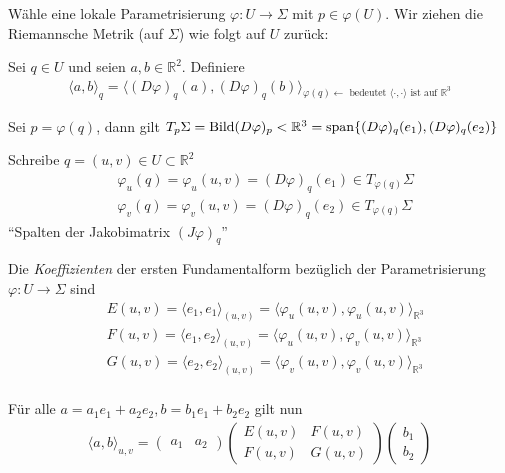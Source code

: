 \documentclass[../main.tex]{subfiles}
\begin{document}
Wähle eine lokale Parametrisierung $\varphi : U \to \Sigma$ mit $p \in \varphi (U)$.
Wir ziehen die Riemannsche Metrik (auf $\Sigma$) wie folgt auf $U$ zurück:

Sei $q \in U$ und seien $a,b \in \mathbb{R}^2$.
Definiere
\begin{align*}
    \langle a,b \rangle _q = \langle (D\varphi)_q(a), (D\varphi)_q(b)\rangle{_{\varphi(q) \leftarrow { \text{ bedeutet }\langle \cdot, \cdot \rangle \text{ ist auf } \mathbb{R}^3}}}
\end{align*}

Sei $p=\varphi (q)$, dann gilt $T_p\Sigma = \operatorname{Bild} (D\varphi)_p < \mathbb{R}^3 = \operatorname{span} \{ (D\varphi)_q(e_1),(D\varphi)_q(e_2)\}$

\begin{notation}
    Schreibe $q= (u,v) \in U \subset \mathbb{R}^2$
    \begin{align*}
        &\varphi_u (q)= \varphi_u(u,v) = (D\varphi)_q(e_1)\in T_{\varphi(q)}\Sigma \\
        &\varphi_v (q)= \varphi_v(u,v) = (D\varphi)_q(e_2)\in T_{\varphi(q)}\Sigma
    \end{align*}``Spalten der Jakobimatrix $(J\varphi)_q$''
\end{notation}

Die \emph{Koeffizienten} der ersten Fundamentalform bezüglich der Parametrisierung $\varphi: U \to \Sigma$ sind
\begin{align*}
    &E(u,v) = \langle e_1, e_1\rangle_{(u,v)} = \langle \varphi_u(u,v),\varphi_u(u,v)\rangle _{\mathbb{R}^3} \\
    &F(u,v) = \langle e_1, e_2\rangle_{(u,v)} = \langle \varphi_u(u,v),\varphi_v(u,v)\rangle _{\mathbb{R}^3} \\
    &G(u,v) = \langle e_2, e_2\rangle_{(u,v)} = \langle \varphi_v(u,v),\varphi_v(u,v)\rangle _{\mathbb{R}^3} \\
\end{align*}

Für alle $a=a_1e_1+a_2e_2, b=b_1e_1+b_2e_2$ gilt nun
\begin{align*}
    \langle a,b \rangle_{u,v} = \begin{pmatrix}
        a_1 & a_2
    \end{pmatrix}\begin{pmatrix}
        E(u,v) & F(u,v) \\
        F(u,v) & G(u,v)
    \end{pmatrix}\begin{pmatrix}
        b_1 \\ b_2
    \end{pmatrix}
\end{align*}
\end{document}
